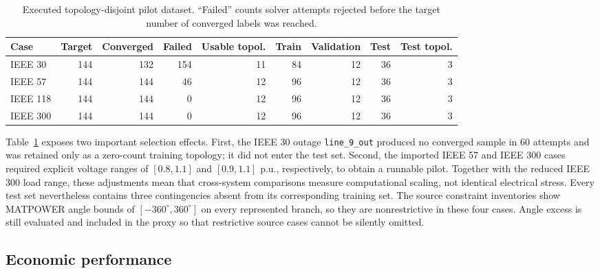 \documentclass[final,5p,times,twocolumn]{elsarticle}
\begin{document}
\begin{table}[t]
  \centering
  \caption{Executed topology-disjoint pilot dataset. ``Failed'' counts solver
  attempts rejected before the target number of converged labels was reached.}
  \label{tab:pilot_data}
  \begin{tabular}{lrrrrrrrr}
    \toprule
    Case & Target & Converged & Failed & Usable topol. &
    Train & Validation & Test & Test topol. \\
    \midrule
    IEEE 30  & 144 & 132 & 154 & 11 & 84 & 12 & 36 & 3 \\
    IEEE 57  & 144 & 144 & 46  & 12 & 96 & 12 & 36 & 3 \\
    IEEE 118 & 144 & 144 & 0   & 12 & 96 & 12 & 36 & 3 \\
    IEEE 300 & 144 & 144 & 0   & 12 & 96 & 12 & 36 & 3 \\
    \bottomrule
  \end{tabular}
\end{table}

Table~\ref{tab:pilot_data} exposes two important selection effects. First, the
IEEE 30 outage \texttt{line\_9\_out} produced no converged sample in 60
attempts and was retained only as a zero-count training topology; it did not
enter the test set. Second, the imported IEEE 57 and IEEE 300 cases required
explicit voltage ranges of $[0.8,1.1]$ and $[0.9,1.1]$ p.u., respectively, to
obtain a runnable pilot. Together with the reduced IEEE 300 load range, these
adjustments mean that cross-system comparisons measure computational scaling,
not identical electrical stress. Every test set nevertheless contains three
contingencies absent from its corresponding training set.
The source constraint inventories show MATPOWER angle bounds of
$[-360^\circ,360^\circ]$ on every represented branch, so they are
nonrestrictive in these four cases. Angle excess is still evaluated and
included in the proxy so that restrictive source cases cannot be silently
omitted.

\subsection{Economic performance}


\end{document}
